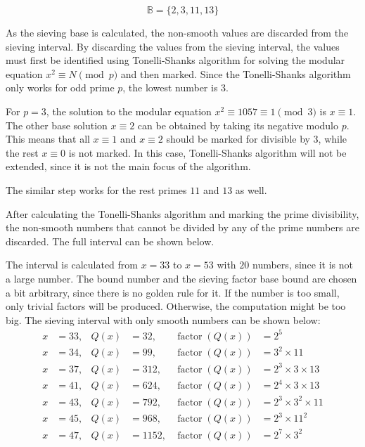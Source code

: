 \documentclass[11pt,a4paper]{article}
\begin{document}
\[\mathbb{B} = \{2, 3, 11, 13\}\]

As the sieving base is calculated, the non-smooth values are discarded from the sieving interval. By discarding the values from the sieving interval, the values must first be identified using Tonelli-Shanks algorithm for solving the modular equation $x^2 \equiv N \pmod p$ and then marked. Since the Tonelli-Shanks algorithm only works for odd prime $p$, the lowest number is $3$.

For $p=3$, the solution to the modular equation $x^2 \equiv 1057 \equiv 1 \pmod 3$ is $x \equiv 1$. The other base solution $x \equiv 2$ can be obtained by taking its negative modulo $p$. This means that all $x \equiv 1$ and $x \equiv 2$ should be marked for divisible by $3$, while the rest $x \equiv 0$ is not marked. In this case, Tonelli-Shanks algorithm will not be extended, since it is not the main focus of the algorithm.

The similar step works for the rest primes $11$ and $13$ as well.

After calculating the Tonelli-Shanks algorithm and marking the prime divisibility, the non-smooth numbers that cannot be divided by any of the prime numbers are discarded. The full interval can be shown below.

The interval is calculated from $x=33$ to $x=53$ with $20$ numbers, since it is not a large number. The bound number and the sieving factor base bound are chosen a bit arbitrary, since there is no golden rule for it. If the number is too small, only trivial factors will be produced. Otherwise, the computation might be too big. The sieving interval with only smooth numbers can be shown below:
\[
\begin{aligned}
x&=33, & Q(x)&=32, & \operatorname{factor}(Q(x))&=2^{5}\\
x&=34, & Q(x)&=99, & \operatorname{factor}(Q(x))&=3^{2}\times11\\
x&=37, & Q(x)&=312, & \operatorname{factor}(Q(x))&=2^{3}\times3\times13\\
x&=41, & Q(x)&=624, & \operatorname{factor}(Q(x))&=2^{4}\times3\times13\\
x&=43, & Q(x)&=792, & \operatorname{factor}(Q(x))&=2^{3}\times3^{2}\times11\\
x&=45, & Q(x)&=968, & \operatorname{factor}(Q(x))&=2^{3}\times11^{2}\\
x&=47, & Q(x)&=1152, & \operatorname{factor}(Q(x))&=2^{7}\times3^{2}
\end{aligned}
\]
\end{document}
